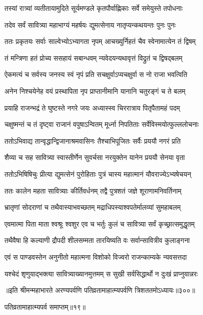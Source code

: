 \begin{center}


\twolineshloka
{तस्यां रात्र्यां व्यतीतायामुदिते सूर्यमण्डले}
{कृतपौर्वाह्णिकाः सर्वे समेयुस्ते तपोधनाः}


\twolineshloka
{तदेव सर्वं सावित्र्या महाभाग्यं महर्षयः}
{द्युमत्सेनाय नातृप्यन्कथयन्तः पुनः पुनः}


\twolineshloka
{ततः प्रकृतयः सर्वाः साल्वेभ्योऽभ्यागता नृपम्}
{आचख्युर्निहतं चैव स्वेनामात्येन तं द्विषम्}


\twolineshloka
{तं मन्त्रिणा हतं प्रोच्य ससहायं सबान्धवम्}
{न्यवेदयन्यथावृत्तं विद्रुतं च द्विषद्बलम्}


\twolineshloka
{ऐकमत्यं च सर्वस्य जनस्य स्वं नृपं प्रति}
{सचक्षुर्वाऽप्यचक्षुर्वा स नो राजा भवत्विति}


\twolineshloka
{अनेन निश्चयेनेह वयं प्रस्थापिता नृप}
{प्राप्तानीमानि यानानि चतुरङ्गं च ते बलम्}


\twolineshloka
{प्रयाहि राजन्भद्रं ते घुष्टस्ते नगरे जयः}
{अध्यास्स्व चिररात्राय पितृपैतामहं पदम्}




\twolineshloka
{चक्षुष्मन्तं च तं दृष्ट्वा राजानं वपुषाऽन्वितम्}
{मूर्ध्ना निपतिताः सर्वेविस्मयोत्फुल्ललोचनाः}


\twolineshloka
{ततोऽभिवाद्य तान्वृद्धान्द्विजानाश्रमवासिनः}
{तैश्चाभिपूजितः सर्वैः प्रययौ नगरं प्रति}


\twolineshloka
{शैव्या च सह सावित्र्या स्वास्तीर्णेन सुवर्चसा}
{नरयुक्तेन यानेन प्रययौ सेनया वृता}


\twolineshloka
{ततोऽभिषिषिचुः प्रीत्या द्युमत्सेनं पुरोहिताः}
{पुत्रं चास्य महात्मानं यौवराज्येऽभ्यषेचयन्}


\twolineshloka
{ततः कालेन महता सावित्र्याः कीर्तिवर्धनम्}
{तद्वै पुत्रशतं जज्ञे शूराणामनिवर्तिनाम्}


\twolineshloka
{भ्रातृणां सोदराणां च तथैवास्याभवच्छतम्}
{मद्राधिपस्याश्वपतेर्मालव्यां सुमहाबलम्}


\twolineshloka
{एवमात्मा पिता माता श्वश्रूः श्वशुर एव च}
{भर्तुः कुलं च सावित्र्या सर्वं कृच्छ्रात्समुद्धृतम्}


\twolineshloka
{तथैवैषा हि कल्याणी द्रौपदी शीलसम्मता}
{तारयिष्यति वः सर्वान्सावित्रीव कुलाङ्गना}




\twolineshloka
{एवं स पाण्डवस्तेन अनुनीतो महात्मना}
{विशोको विज्वरो राजन्काम्यके न्यवसत्तदा}


\twolineshloka
{यश्चेदं शृणुयाद्भक्त्या सावित्र्याख्यानमुत्तमम्}
{स सुखी सर्वसिद्धार्थो न दुःखं प्राप्नुयान्नरः}


॥इति श्रीमन्महाभारते अरण्यपर्वणि
पतिव्रतामाहात्म्यपर्वणि त्रिशततमोऽध्यायः॥३००॥

पतिव्रतामाहात्म्यपर्व समाप्तम्॥१९॥ 

\end{center}